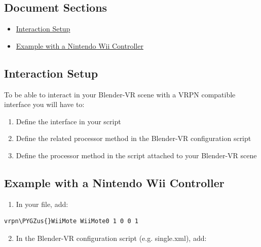 \documentclass[a4,10pt,openany,oneside]{sphinxmanual}
\def\PYGZus{\char`\_}
\begin{document}
\subsection{Document Sections}
\label{components/vrpn:document-sections}\begin{itemize}
\item {} 
{\hyperref[components/vrpn:interaction-setup]{Interaction Setup}}

\item {} 
{\hyperref[components/vrpn:example-with-a-nintendo-wii-controller]{Example with a Nintendo Wii Controller}}

\end{itemize}


\subsection{Interaction Setup}
\label{components/vrpn:interaction-setup}
To be able to interact in your Blender-VR scene with a VRPN compatible interface you
will have to:
\begin{enumerate}
\item {} 
Define the interface in your  script

\item {} 
Define the related processor method in the Blender-VR  configuration script

\item {} 
Define the processor method in the  script attached to your Blender-VR scene

\end{enumerate}


\subsection{Example with a Nintendo Wii Controller}
\label{components/vrpn:example-with-a-nintendo-wii-controller}\begin{enumerate}
\item {} 
In your  file, add:

\end{enumerate}

\begin{Verbatim}[commandchars=\\\{\}]
vrpn\PYGZus{}WiiMote WiiMote0 1 0 0 1
\end{Verbatim}
\begin{enumerate}
\setcounter{enumi}{1}
\item {} 
In the Blender-VR  configuration script (e.g. single.xml), add:

\end{enumerate}
\end{document}
